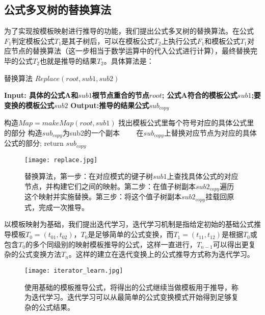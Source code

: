 \documentclass[runningheads]{llncs}
\begin{document}
\subsection{公式多叉树的替换算法}
为了实现按模板映射进行推导的功能，我们提出公式多叉树的替换算法。在公式$F_1$判定模板公式$T_1$是其子树后，可以在模板公式$T_2$上执行公式$F_1$和模板公式$T_1$对应节点的替换算法（这一步相当于数学运算中的代入公式进行计算），最终替换完毕的公式$T_2$也就是推导的结果$T_2$。具体算法是：

\begin{algorithm}[t]
\caption{替换算法 $Replace(root,sub1,sub2)$} %
\hspace*{0.02in} {\bf Input: 具体的公式A和$sub1$根节点重合的节点$root$; 公式A符合的模板公式$sub1$;要变换的模板公式$sub2$} 
\hspace*{0.02in} {\bf Output:推导的结果公式$sub_{copy}$} 
\begin{algorithmic}[1]
\State 构造$Map = makeMap(root,sub1)$ 找出模板公式里每个符号对应的具体公式里的部分
\State 构造$sub_{copy}$为sub2的一个副本
　　\State 在$sub_{copy}$上替换对应节点为对应的具体公式的部分;
\EndFor
\State return $sub_{copy}$
\end{algorithmic}
\end{algorithm}

\begin{figure}[H]
\centering
\texttt{[image: replace.jpg]}
\caption{替换算法，第一步：在对应模式的键子树$sub1$上查找具体公式的对应节点，并构建它们之间的映射。第二步：在值子树副本$sub2_{copy}$遍历这个映射并实施替换。第三步：将这个值子树副本$sub2_{copy}$挂载回原式，完成一次推导。}
\end{figure}


以模板映射为基础，我们提出迭代学习，迭代学习机制是指给定初始的基础公式推导模板$T_0=(t_01,t_02)$，$T_0$是足够简单的公式变换，而$T_1=(t_11,t_12)$是根据$T_0$或包含$T_0$的多个同级别的映射模板推导的公式，这样一直进行，$T_{n-1}$可以得出更复杂的公式变换方法$T_{n}$。这样的建立在迭代变换上的公式推导方式称为迭代学习。



\begin{figure}[H]
\centering
\texttt{[image: iterator\_learn.jpg]}
\caption{使用基础的模板推导公式，将得出的公式继续当做模板用于推导，称为迭代学习。迭代学习可以从最简单的公式变换模式开始得到足够复杂的公式结果。}
\end{figure}
\end{document}
